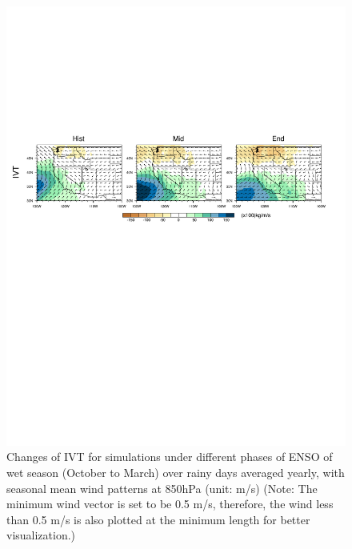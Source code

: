\documentclass{ametsoc}
\begin{document}
\begin{figure}
\begin{center}
\includegraphics[width=6in]{discussion_enso.pdf}
\caption{Changes of IVT for simulations under different phases of ENSO of wet season (October to March) over rainy days averaged yearly, with seasonal mean wind patterns at 850hPa (unit: m/s) (Note: The minimum wind vector is set to be 0.5 m/s, therefore, the wind less than 0.5 m/s is also plotted at the minimum length for better visualization.)}
\label{fig:discussEnso}
\end{center}
\end{figure}

\end{document}
